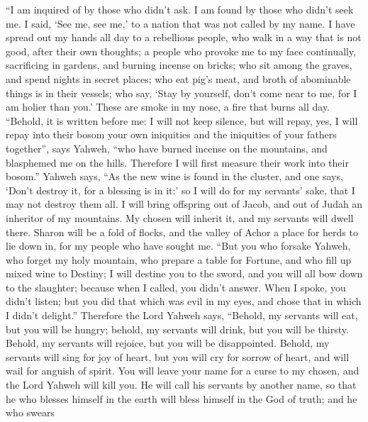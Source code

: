  ``I am inquired of by those who didn't ask. I am found by
those who didn't seek me. I said, `See me, see me,' to a nation that was
not called by my name.  I have spread out my hands all day
to a rebellious people, who walk in a way that is not good, after their
own thoughts;  a people who provoke me to my face
continually, sacrificing in gardens, and burning incense on bricks;
 who sit among the graves, and spend nights in secret
places; who eat pig's meat, and broth of abominable things is in their
vessels;  who say, `Stay by yourself, don't come near to
me, for I am holier than you.' These are smoke in my nose, a fire that
burns all day.  ``Behold, it is written before me: I will
not keep silence, but will repay, yes, I will repay into their bosom
 your own iniquities and the iniquities of your fathers
together'', says Yahweh, ``who have burned incense on the mountains, and
blasphemed me on the hills. Therefore I will first measure their work
into their bosom.''  Yahweh says, ``As the new wine is
found in the cluster, and one says, `Don't destroy it, for a blessing is
in it:' so I will do for my servants' sake, that I may not destroy them
all.  I will bring offspring out of Jacob, and out of
Judah an inheritor of my mountains. My chosen will inherit it, and my
servants will dwell there.  Sharon will be a fold of
flocks, and the valley of Achor a place for herds to lie down in, for my
people who have sought me.  ``But you who forsake Yahweh,
who forget my holy mountain, who prepare a table for Fortune, and who
fill up mixed wine to Destiny;  I will destine you to the
sword, and you will all bow down to the slaughter; because when I
called, you didn't answer. When I spoke, you didn't listen; but you did
that which was evil in my eyes, and chose that in which I didn't
delight.''  Therefore the Lord Yahweh says, ``Behold, my
servants will eat, but you will be hungry; behold, my servants will
drink, but you will be thirsty. Behold, my servants will rejoice, but
you will be disappointed.  Behold, my servants will sing
for joy of heart, but you will cry for sorrow of heart, and will wail
for anguish of spirit.  You will leave your name for a
curse to my chosen, and the Lord Yahweh will kill you. He will call his
servants by another name,  so that he who blesses himself
in the earth will bless himself in the God of truth; and he who swears
